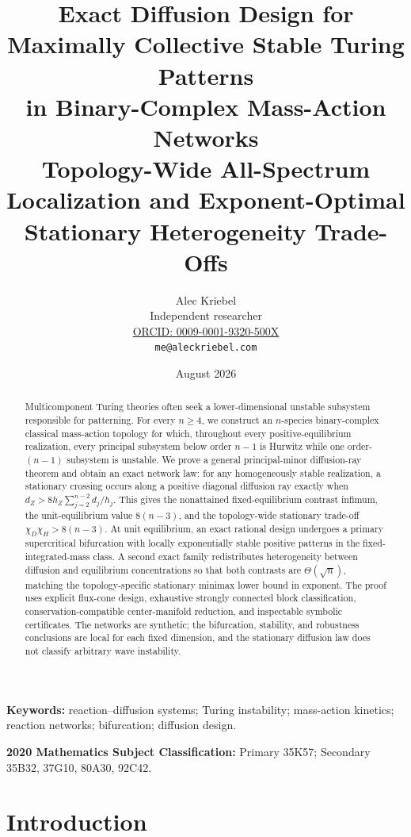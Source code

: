 \documentclass[11pt]{article}
\title{Exact Diffusion Design for Maximally Collective Stable Turing Patterns\\
\large in Binary-Complex Mass-Action Networks\\[0.25em]
\normalsize Topology-Wide All-Spectrum Localization and Exponent-Optimal Stationary Heterogeneity Trade-Offs}
\author{Alec Kriebel\\\small Independent researcher\\
\small \href{https://orcid.org/0009-0001-9320-500X}{ORCID: 0009-0001-9320-500X}\\
\small \texttt{me@aleckriebel.com}}
\date{August 2026}
\newif\ifsiadsreview
\theoremstyle{definition}
\newcommand{\1}{\mathbf 1}
\begin{document}
\ifsiadsreview\linenumbers\fi
\maketitle

\begin{abstract}
Multicomponent Turing theories often seek a lower-dimensional unstable
subsystem responsible for patterning.  For every $n\ge4$, we construct an
$n$-species binary-complex classical mass-action topology for which, throughout
every positive-equilibrium realization, every principal subsystem below order
$n-1$ is Hurwitz while one order-$(n-1)$ subsystem is unstable.  We prove a
general principal-minor diffusion-ray theorem and obtain an exact network law:
for any homogeneously stable realization, a stationary crossing occurs along a
positive diagonal diffusion ray exactly when
$d_Z>8h_Z\sum_{j=2}^{n-2}d_j/h_j$.  This gives the nonattained fixed-equilibrium
contrast infimum, the unit-equilibrium value $8(n-3)$, and the topology-wide
stationary trade-off $\chi_D\chi_H>8(n-3)$.  At unit equilibrium, an exact rational design
undergoes a primary supercritical bifurcation with locally exponentially
stable positive patterns in the fixed-integrated-mass class.  A second exact
family redistributes heterogeneity
between diffusion and equilibrium concentrations so that both contrasts are
$\Theta(\sqrt n)$, matching the topology-specific stationary minimax lower
bound in exponent.
The proof uses explicit flux-cone design, exhaustive strongly connected block
classification, conservation-compatible center-manifold reduction, and
inspectable symbolic certificates.  The networks are synthetic; the
bifurcation, stability, and robustness conclusions are local for each fixed
dimension, and the stationary diffusion law does not classify arbitrary wave
instability.
\end{abstract}

\noindent\textbf{Keywords:}
reaction--diffusion systems; Turing instability; mass-action kinetics;
reaction networks; bifurcation; diffusion design.

\smallskip
\noindent\textbf{2020 Mathematics Subject Classification:}
Primary 35K57; Secondary 35B32, 37G10, 80A30, 92C42.

\section{Introduction}
\end{document}
